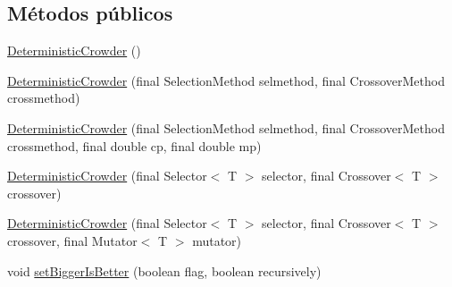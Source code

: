 \subsection*{Métodos públicos}
\begin{DoxyCompactItemize}
\item 
\hyperlink{classjenes_1_1stage_1_1operator_1_1common_1_1_deterministic_crowder_3_01_t_01extends_01_chromosome_01_4_ad52c0d6a4bc032c8c198bf05cc3acf6f}{Deterministic\-Crowder} ()
\item 
\hyperlink{classjenes_1_1stage_1_1operator_1_1common_1_1_deterministic_crowder_3_01_t_01extends_01_chromosome_01_4_ae974a4b359a9a467dfa434dd47a27cf7}{Deterministic\-Crowder} (final Selection\-Method selmethod, final Crossover\-Method crossmethod)
\item 
\hyperlink{classjenes_1_1stage_1_1operator_1_1common_1_1_deterministic_crowder_3_01_t_01extends_01_chromosome_01_4_aa59e2a1dcdb2cd6cc7a70e344a77dd31}{Deterministic\-Crowder} (final Selection\-Method selmethod, final Crossover\-Method crossmethod, final double cp, final double mp)
\item 
\hyperlink{classjenes_1_1stage_1_1operator_1_1common_1_1_deterministic_crowder_3_01_t_01extends_01_chromosome_01_4_ad7eed64a7fe60239ba3289ebf6003e8c}{Deterministic\-Crowder} (final Selector$<$ T $>$ selector, final Crossover$<$ T $>$ crossover)
\item 
\hyperlink{classjenes_1_1stage_1_1operator_1_1common_1_1_deterministic_crowder_3_01_t_01extends_01_chromosome_01_4_a6359043178a5e4d8922485528acbbcec}{Deterministic\-Crowder} (final Selector$<$ T $>$ selector, final Crossover$<$ T $>$ crossover, final Mutator$<$ T $>$ mutator)
\item 
void \hyperlink{classjenes_1_1stage_1_1operator_1_1common_1_1_deterministic_crowder_3_01_t_01extends_01_chromosome_01_4_af7b258f528b701713808c16bca29ca66}{set\-Bigger\-Is\-Better} (boolean flag, boolean recursively)
\end{DoxyCompactItemize}
